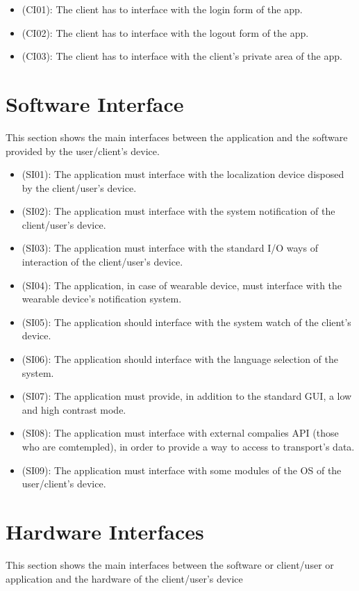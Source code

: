 \documentclass[a4paper]{book}
\begin{document}
\begin{itemize}
\item (CI01): The client has to interface with the login form of the app.
\item (CI02): The client has to interface with the logout form of the app.
\item (CI03): The client has to interface with the client's private area of the app.
\end{itemize}

\section{Software Interface}
This section shows the main interfaces between the application and the software provided by the user/client's device.

\begin{itemize}
\item (SI01): The application must interface with the localization device disposed by the client/user's device.
\item (SI02): The application must interface with the system notification of the client/user's device.
\item (SI03): The application must interface with the standard I/O ways of interaction of the client/user's device.
\item (SI04): The application, in case of wearable device, must interface with the wearable device's notification system.
\item (SI05): The application should interface with the system watch of the client's device.
\item (SI06): The application should interface with the language selection of the system.
\item (SI07): The application must provide, in addition to the standard GUI, a low and high contrast mode. 
\item (SI08): The application must interface with external compalies API (those who are comtempled), in order to provide a way to access to transport's data.
\item (SI09): The application must interface with some modules of the OS of the user/client's device.
\end{itemize}

\section{Hardware Interfaces}
This section shows the main interfaces between the software or client/user or application and the hardware of the client/user's device
\end{document}
